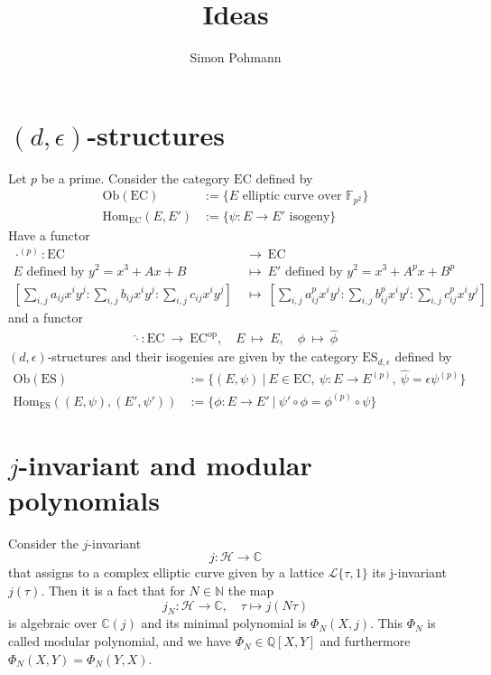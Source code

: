 \documentclass{scrartcl}
\title{Ideas}
\author{Simon Pohmann}
\newcommand{\N}{\mathbb{N}}
\newcommand{\F}{\mathbb{F}}
\newcommand{\C}{\mathbb{C}}
\newcommand{\Half}{\mathcal{H}}
\newcommand{\Lattice}{\mathcal{L}}
\theoremstyle{definition}
\begin{document}
\maketitle

\section{$(d, \epsilon)$-structures}

Let $p$ be a prime.
Consider the category $\mathrm{EC}$ defined by
\begin{align*}
    \mathrm{Ob}(\mathrm{EC}) &:= \{ \text{$E$ elliptic curve over $\F_{p^2}$} \} \\
    \mathrm{Hom}_{\mathrm{EC}}(E, E') &:= \{ \text{$\psi: E \to E'$ isogeny} \}
\end{align*}
Have a functor
\begin{align*}
    \cdot^{(p)}: \mathrm{EC} \ &\to \ \mathrm{EC} \\
    \text{$E$ defined by $y^2 = x^3 + Ax + B$} \ &\mapsto \ \text{$E'$ defined by $y^2 = x^3 + A^p x + B^p$} \\
    \left[ \sum_{i, j} a_{ij} x^i y^j : \sum_{i, j} b_{ij} x^i y^j : \sum_{i, j} c_{ij} x^i y^j \right] \ &\mapsto \ \left[ \sum_{i, j} a_{ij}^p x^i y^j : \sum_{i, j} b_{ij}^p x^i y^j : \sum_{i, j} c_{ij}^p x^i y^j \right]
\end{align*}
and a functor
\begin{align*}
    \hat{\cdot}: \mathrm{EC} \ \to \ \mathrm{EC}^{\mathrm{op}}, \quad E \ \mapsto \ E, \quad \phi \ \mapsto \ \hat{\phi}
\end{align*}
$(d, \epsilon)$-structures and their isogenies are given by the category $\mathrm{ES}_{d, \epsilon}$ defined by
\begin{align*}
    \mathrm{Ob}(\mathrm{ES}) &:= \{ (E, \psi) \ | \ E \in \mathrm{EC}, \ \psi: E \to E^{(p)}, \ \hat{\psi} = \epsilon\psi^{(p)} \} \\
    \mathrm{Hom}_{\mathrm{ES}}((E, \psi), (E', \psi')) &:= \{ \phi: E \to E' \ | \ \psi' \circ \phi = \phi^{(p)} \circ \psi \}
\end{align*}

\section{$j$-invariant and modular polynomials}

Consider the $j$-invariant
\begin{equation*}
    j: \Half \to \C
\end{equation*}
that assigns to a complex elliptic curve given by a lattice $\Lattice\{\tau, 1\}$ its j-invariant $j(\tau)$.
Then it is a fact that for $N \in \N$ the map
\begin{equation*}
    j_N: \Half \to \C, \quad \tau \mapsto j(N\tau)
\end{equation*}
is algebraic over $\C(j)$ and its minimal polynomial is $\Phi_N(X, j)$.
This $\Phi_N$ is called modular polynomial, and we have $\Phi_N \in \mathbb{Q}[X, Y]$ and furthermore $\Phi_N(X, Y) = \Phi_N(Y, X)$.
\end{document}
